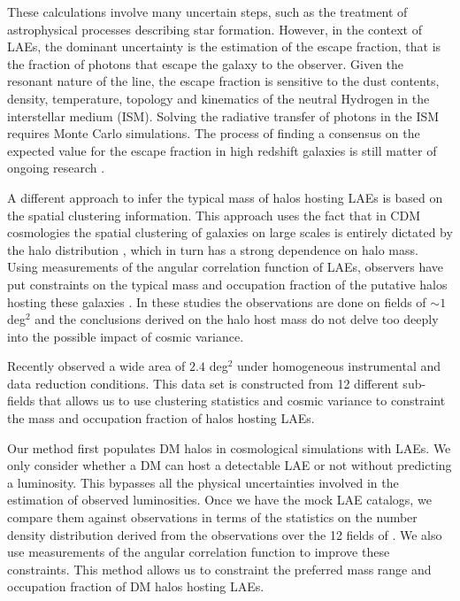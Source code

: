 \documentclass[usenatbib]{mn2e}
\newcommand{\ly}{{\ifmmode{{\rm Ly}\alpha}\else{Ly$\alpha$~}\fi}}
\begin{document}
These calculations involve many uncertain steps, such as the treatment
of astrophysical processes describing star formation. However, in the
context of LAEs, the dominant uncertainty is the estimation of the
escape fraction, that is the fraction of \ly photons that escape the
galaxy to the observer. Given the resonant nature of the \ly line, the escape
fraction is sensitive to  the dust contents, density, temperature, topology and
kinematics of the neutral Hydrogen in the interstellar medium
(ISM). Solving the radiative transfer of \ly photons in the ISM requires Monte
Carlo simulations. The process of finding a consensus on the expected
value for the \ly escape fraction in high redshift galaxies is still
matter of ongoing research
\citep{Neufeld1991,Verhamme2006,ForeroRomero2011,Dijkstra2012,Laursen2013,Orsi2012}.  

A different approach to infer the typical mass of halos hosting
LAEs is based on the spatial clustering information. This approach uses the fact
that in CDM cosmologies the spatial clustering of galaxies on large
scales is entirely dictated by the halo distribution
\citep{Colberg00}, which in turn has a strong dependence on halo
mass. Using measurements of the angular correlation function of LAEs,
observers have put constraints on the typical mass and occupation
fraction of the putative halos hosting these galaxies
\citep{Hayashino2004,Gawiser07,Nilsson2007,Ouchi2010}. In these
studies the observations are done on fields of $\sim 1$ deg$^{2}$ and
the conclusions derived on the halo host mass do not delve too deeply
into the possible impact of cosmic variance.  

Recently \cite{Yamada2012} observed a wide area of $2.4$ deg$^{2}$
under homogeneous instrumental and data reduction conditions. This data
set is constructed from 12 different sub-fields that allows us to use
clustering statistics and cosmic variance to constraint the mass and
occupation fraction of halos hosting LAEs. 

Our method first populates DM halos in cosmological simulations with
LAEs. We only consider whether a DM can host a detectable LAE or not
without predicting a \ly  luminosity. This bypasses all the physical
uncertainties involved in the estimation of observed \ly luminosities.
Once we have the mock LAE catalogs, we compare them against
observations in terms of the  statistics on the number density
distribution derived from the observations over the 12 fields of
\cite{Yamada2012}. We also use measurements of the angular
correlation function to improve these constraints. This method allows
us to constraint the preferred mass range and occupation fraction of DM
halos hosting LAEs.  
 
\end{document}
